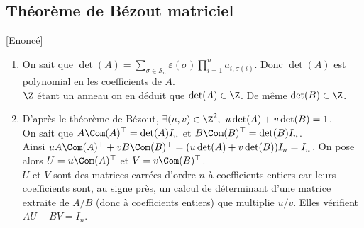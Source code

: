 \documentclass[8pt]{book}
\begin{document}
	\subsection{Théorème de Bézout matriciel }
	\label{Théorème de Bézout matriciel corrigé}
	\textcolor{blue}{\hyperref[Théorème de Bézout mattriciel]{[Enoncé]}}\\
	\begin{enumerate}[leftmargin=*]
		\item On sait que $\det(A)=\displaystyle\sum_{\sigma\in \mathcal S_n}\varepsilon(\sigma)\prod_{i=1}^na_{i,\sigma(i)}$. Donc $\det(A)$ est polynomial en les coefficients de $A$.\\
		$\Z$ étant un anneau on en déduit que $\det(A)\in \Z$. De même $\det(B)\in \Z$.
		\item D'après le théorème de Bézout, $\exists (u,v)\in \Z^2,\ u\det(A)+v\det(B)=1$.\\
		On sait que $A\Com(A)^\top=\det(A)I_n$ et $B\Com(B)^\top=\det(B)I_n$.\\
		Ainsi $uA\Com(A)^\top+vB\Com(B)^\top=(u\det(A)+v\det(B))I_n=I_n$. On pose alors $U=u\Com(A)^\top$ et $V=v\Com(B)^\top$.\\
		$U$ et $V$ sont des matrices carrées d'ordre $n$ à coefficients entiers car leurs coefficients sont, au signe près, un calcul de déterminant d'une matrice extraite de $A/B$ (donc à coefficients entiers) que multiplie $u/v$. Elles vérifient $AU+BV=I_n$.
	\end{enumerate}
	
\end{document}

